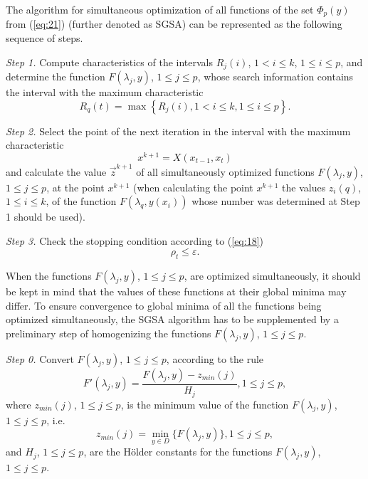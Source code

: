 \documentclass[runningheads]{llncs}
\begin{document}
The algorithm for simultaneous optimization of all functions of the set $\Phi_p(y)$ from (\ref{eq:21}) (further denoted as SGSA) can be represented as the following sequence of steps.

\textit{Step 1.} Compute characteristics of the intervals $R_j (i)$, $1 < i \leq k$, $1 \leq i \leq p$, and determine the function $F(\lambda_j,y)$, $1 \leq j \leq p$, whose search information contains the interval with the maximum characteristic
\begin{equation}
\label{eq:30}
R_q (t)=\max \left\{ R_j (i), 1 < i \leq k, 1 \leq i \leq p \right\}.
\end{equation}

\textit{Step 2.} Select the point of the next iteration in the interval with the maximum characteristic
\begin{equation}
\label{eq:31}
x^{k+1}=X(x_{t-1},x_t )
\end{equation}
and calculate the value $\overrightarrow{z}^{k+1}$ of all simultaneously optimized functions $F(\lambda_j,y)$, $1 \leq j \leq p$, at the point $x^{k+1}$ (when calculating the point  $x^{k+1}$ the values $z_i (q)$, $1 \leq i \leq k$, of the function $F(\lambda_q,y(x_i))$ whose number was determined at Step 1 should be used).

\textit{Step 3.} Check the stopping condition according to (\ref{eq:18})
\begin{equation}
\label{eq:32}
\rho_t \leq \varepsilon .
\end{equation}

When the functions $F(\lambda_j,y)$, $1 \leq j \leq p$, are optimized simultaneously, it should be kept in mind that the values of these functions at their global minima may differ.  To ensure convergence to global minima of all the functions being optimized simultaneously, the SGSA algorithm has to be supplemented by a preliminary step of homogenizing the functions $F(\lambda_j,y)$, $1 \leq j \leq p$.

\textit{Step 0.} Convert $F(\lambda_j,y)$, $1 \leq j \leq p$, according to the rule
\begin{equation}
\label{eq:33}
F'(\lambda_j,y)=\frac{F(\lambda_j,y)-z_{min} (j)}{H_j}, 1 \leq j \leq p,
\end{equation}
where $z_{min}(j)$, $1 \leq j \leq p$, is the minimum value of the function $F(\lambda_j,y)$, $1 \leq j \leq p$, i.e. 
\begin{equation}
\label{eq:34_2}
z_{min} (j)=\min_{y\in D} \{ F(\lambda_j,y) \}, 1 \leq j \leq p,
\end{equation}
and $H_j$, $1 \leq j \leq p$, are the H{\"o}lder constants for the functions $F(\lambda_j,y)$, $1 \leq j \leq p$.
\end{document}
